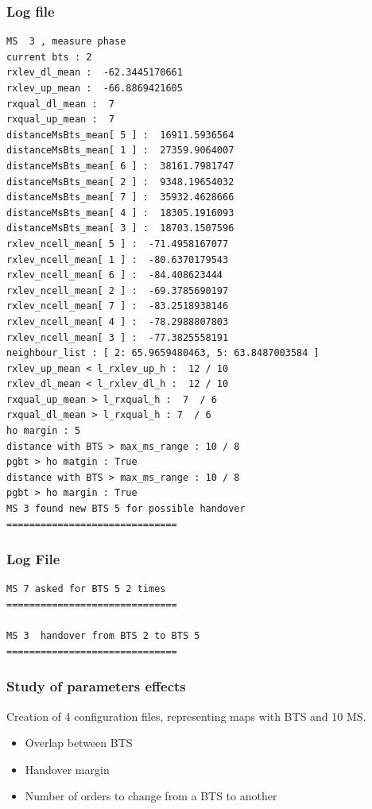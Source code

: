 \documentclass{beamer}
\begin{document}
\begin{frame}[fragile]
\frametitle{Log file}

{\tiny
\begin{verbatim}
MS  3 , measure phase
current bts : 2
rxlev_dl_mean :  -62.3445170661
rxlev_up_mean :  -66.8869421605
rxqual_dl_mean :  7
rxqual_up_mean :  7
distanceMsBts_mean[ 5 ] :  16911.5936564
distanceMsBts_mean[ 1 ] :  27359.9064007
distanceMsBts_mean[ 6 ] :  38161.7981747
distanceMsBts_mean[ 2 ] :  9348.19654032
distanceMsBts_mean[ 7 ] :  35932.4628666
distanceMsBts_mean[ 4 ] :  18305.1916093
distanceMsBts_mean[ 3 ] :  18703.1507596
rxlev_ncell_mean[ 5 ] :  -71.4958167077
rxlev_ncell_mean[ 1 ] :  -80.6370179543
rxlev_ncell_mean[ 6 ] :  -84.408623444
rxlev_ncell_mean[ 2 ] :  -69.3785690197
rxlev_ncell_mean[ 7 ] :  -83.2518938146
rxlev_ncell_mean[ 4 ] :  -78.2988807803
rxlev_ncell_mean[ 3 ] :  -77.3825558191
neighbour_list : [ 2: 65.9659480463, 5: 63.8487003584 ]
rxlev_up_mean < l_rxlev_up_h :  12 / 10
rxlev_dl_mean < l_rxlev_dl_h :  12 / 10
rxqual_up_mean > l_rxqual_h :  7  / 6
rxqual_dl_mean > l_rxqual_h : 7  / 6
ho margin : 5
distance with BTS > max_ms_range : 10 / 8
pgbt > ho matgin : True
distance with BTS > max_ms_range : 10 / 8
pgbt > ho margin : True
MS 3 found new BTS 5 for possible handover
==============================
\end{verbatim}
}
\end{frame}
\begin{frame}[fragile]
\frametitle{Log File}

{\tiny
\begin{verbatim}
MS 7 asked for BTS 5 2 times
==============================

MS 3  handover from BTS 2 to BTS 5
==============================

\end{verbatim}
}

\end{frame}
\begin{frame}
\frametitle{Study of parameters effects}
Creation of 4 configuration files, representing maps with BTS and 10 MS.
\begin{itemize}
 \item Overlap between BTS
 \item Handover margin
 \item Number of orders to change from a BTS to another
\end{itemize}
\end{frame}
\end{document}
